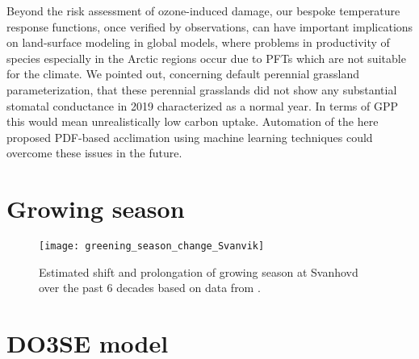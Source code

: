 \documentclass[bg, manuscript]{copernicus}
\begin{document}
Beyond the risk assessment of ozone-induced damage, our bespoke temperature response functions, once verified by observations, can have important implications on land-surface modeling in global models, where problems in productivity of species especially in the Arctic regions occur due to PFTs which are not suitable for the climate. We pointed out, concerning default perennial grassland parameterization, that these perennial grasslands did not show any substantial stomatal conductance in 2019 characterized as a normal year. In terms of GPP this would mean unrealistically low carbon uptake. Automation of the here proposed PDF-based acclimation using machine learning techniques could overcome these issues in the future.










\clearpage

\appendix
\section{Growing season}
\label{appendix:growing_season}

\begin{figure*}[th]
  \texttt{[image: greening\_season\_change\_Svanvik]}
  \caption{Estimated shift and prolongation of growing season at Svanhovd over the past 6 decades based on data from \citet{SeNorge}.}
  \label{fig:greening_season_change_Svanvik}
\end{figure*}

\section{DO3SE model}
\label{appendix:do3se_model}
\end{document}
